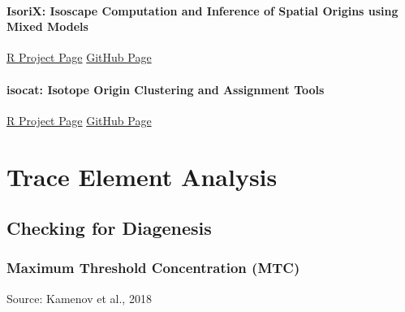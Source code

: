 \documentclass[
  letterpaper,
  DIV=11,
  numbers=noendperiod]{scrreprt}
\begin{document}
\subsubsection*{IsoriX: Isoscape Computation and Inference of Spatial
Origins using Mixed
Models}\label{isorix-isoscape-computation-and-inference-of-spatial-origins-using-mixed-models}

\href{https://CRAN.R-project.org/package=IsoriX}{R Project Page}
\textbar{} \href{https://github.com/courtiol/IsoriX}{GitHub Page}

\subsubsection*{isocat: Isotope Origin Clustering and Assignment
Tools}\label{isocat-isotope-origin-clustering-and-assignment-tools}

\href{https://CRAN.R-project.org/package=isocat}{R Project Page}
\textbar{} \href{https://github.com/cjcampbell/isocat}{GitHub Page}

\chapter{Trace Element Analysis}\label{trace-element-analysis}

\section{Checking for Diagenesis}\label{checking-for-diagenesis}

\subsection{Maximum Threshold Concentration
(MTC)}\label{maximum-threshold-concentration-mtc}

Source: Kamenov et al., 2018
\end{document}
